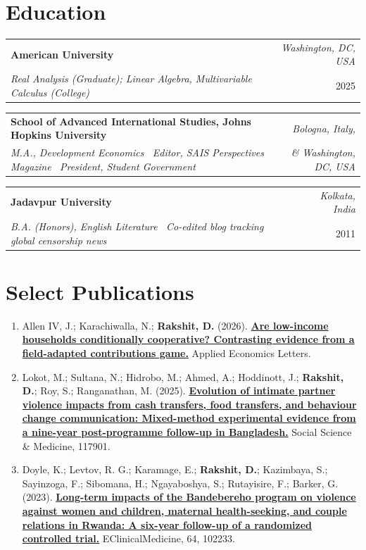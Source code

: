 \documentclass[a4paper,11pt]{article}
\makeatletter
\newcommand{\cvheadfont}{\fontsize{12}{14.5}\selectfont}
\newcommand{\cvheading}[4]{%
  \vspace{2mm}\par\noindent
  \begin{tabular*}{\textwidth}{@{}l@{\extracolsep{\fill}}r@{}}
    {\cvheadfont\textbf{#1}} & \textit{\footnotesize #2} \\[3pt]
    \textit{\footnotesize #3} & \footnotesize #4 \\
  \end{tabular*}\par\vspace{-0.4mm}
}
\newcommand{\cvsubheading}[1]{\vspace{2mm}\par\noindent{\cvheadfont\textbf{#1}}\par}
\newcommand{\jobsstart}{}
\newcommand{\jobsend}{\vspace{1mm}}
\makeatother
\begin{document}
\section{Education}
\jobsstart
  \cvheading{American University}{Washington, DC, USA}
  {Real Analysis (Graduate); Linear Algebra, Multivariable Calculus (College)} {2025}

\cvheading{School of Advanced International Studies, Johns Hopkins University}{Bologna, Italy,}
{M.A., Development Economics \,\textbar\; Editor, \textit{SAIS Perspectives Magazine} \,\textbar\; President, Student Government}{\textit{\& Washington, DC, USA}\enspace 2019}

  \cvheading{Jadavpur University}{Kolkata, India}
  {B.A. (Honors), English Literature \,\textbar\; Co-edited blog tracking global censorship news}{2011}
\jobsend


\hypertarget{publications}{}
\section{Select Publications}
\small

\cvsubheading{Peer-reviewed journal articles}
\begin{enumerate}[leftmargin=1.5em,labelsep=0pt,itemindent=-1.5em,label={},itemsep=0.4mm,topsep=1mm]
\item Allen IV, J.; Karachiwalla, N.; \textbf{Rakshit, D.} (2026). \href{https://doi.org/10.1080/13504851.2026.2716401}{\textbf{Are low-income households conditionally cooperative? Contrasting evidence from a field-adapted contributions game.}} Applied Economics Letters.
  \item Lokot, M.; Sultana, N.; Hidrobo, M.; Ahmed, A.; Hoddinott, J.; \textbf{Rakshit, D.}; Roy, S.; Ranganathan, M. (2025). \href{https://doi.org/10.1016/j.socscimed.2025.117901}{\textbf{Evolution of intimate partner violence impacts from cash transfers, food transfers, and behaviour change communication: Mixed-method experimental evidence from a nine-year post-programme follow-up in Bangladesh.}} Social Science \& Medicine, 117901.
  \item Doyle, K.; Levtov, R. G.; Karamage, E.; \textbf{Rakshit, D.}; Kazimbaya, S.; Sayinzoga, F.; Sibomana, H.; Ngayaboshya, S.; Rutayisire, F.; Barker, G. (2023). \href{https://doi.org/10.1016/j.eclinm.2023.102233}{\textbf{Long-term impacts of the Bandebereho program on violence against women and children, maternal health-seeking, and couple relations in Rwanda: A six-year follow-up of a randomized controlled trial.}} EClinicalMedicine, 64, 102233.
\end{enumerate}
\end{document}
